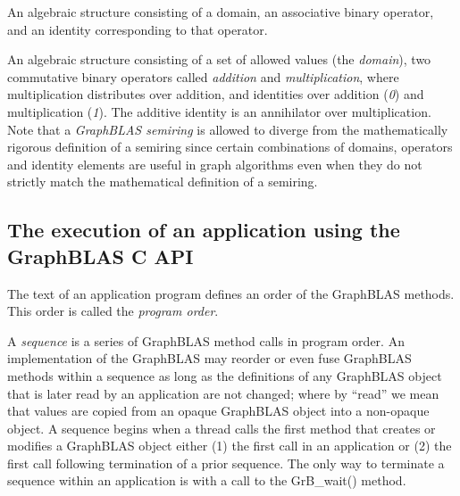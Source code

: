  An algebraic structure consisting of a domain, an associative binary operator, and an identity corresponding to 
that operator.

 An algebraic structure consisting of a set of allowed values
(the \emph{domain}), two commutative binary operators called \emph{addition} 
and \emph{multiplication}, where multiplication distributes over addition,
and identities over addition (\emph{0}) and multiplication (\emph{1}).  The additive
identity is an annihilator over multiplication.   
Note that a \emph{GraphBLAS semiring} is allowed to diverge from the mathematically 
rigorous definition of a semiring since certain combinations of domains, operators and identity 
elements are useful in graph algorithms even when they do not strictly match the mathematical
definition of a semiring.
\glossEnd



\subsection{The execution of an application using the GraphBLAS C API}
\glossBegin
{} The text of an application program defines an order
of the GraphBLAS methods. This order is called the \emph{program order}.

 A \emph{sequence} is a series of GraphBLAS method calls in program order.  
An implementation of the GraphBLAS may reorder or even fuse GraphBLAS methods within a 
sequence as long as the definitions of any GraphBLAS object that is later read by an application 
are not changed; where by ``read'' we mean that values are copied from an opaque GraphBLAS 
object into a non-opaque object.  A sequence begins when a thread calls the first method that creates
or modifies a GraphBLAS object either (1) the first call in an application or (2) the first call 
following termination of a prior sequence.  The only way to terminate a sequence within an 
application is with a call to the GrB\_wait() method. 

